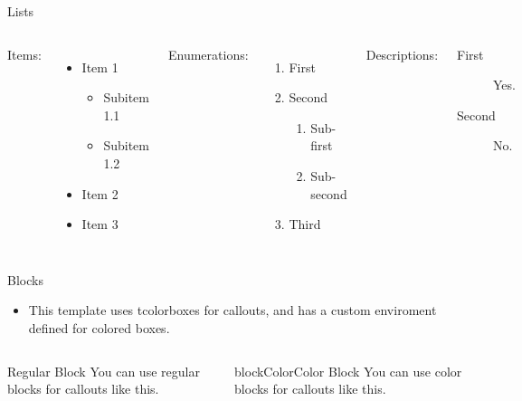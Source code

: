 \begin{frame}{Lists}
	\begin{columns}[T, onlytextwidth] %
			Items:
			\begin{itemize}
				\item Item 1
				\begin{itemize}
					\item Subitem 1.1
					\item Subitem 1.2
				\end{itemize}
				\item Item 2
				\item Item 3
			\end{itemize}
		
			Enumerations:
			\begin{enumerate}
				\item First
				\item Second
				\begin{enumerate}
					\item Sub-first
					\item Sub-second
				\end{enumerate}
				\item Third
			\end{enumerate}
		
			Descriptions:
			\begin{description}
				\item[First] Yes.
				\item[Second] No.
			\end{description}
	\end{columns}
\end{frame}



\begin{frame}{Blocks}
    \begin{itemize}
        \item This template uses tcolorboxes for callouts, and has a custom enviroment defined for colored boxes.
    \end{itemize}
    \begin{columns}[T, onlytextwidth]
        \setlength{\columnsep}{2pt} %
        \begin{column}{0.48\textwidth}
            \begin{block}{Regular Block}
                You can use regular blocks for callouts like this.
            \end{block}
        \end{column}
        \begin{column}{0.48\textwidth}
            \begin{colorblock}[slideBG]{blockColor}{Color Block}
                You can use  color blocks for callouts like this.
            \end{colorblock}
        \end{column}
    \end{columns}
\end{frame}

